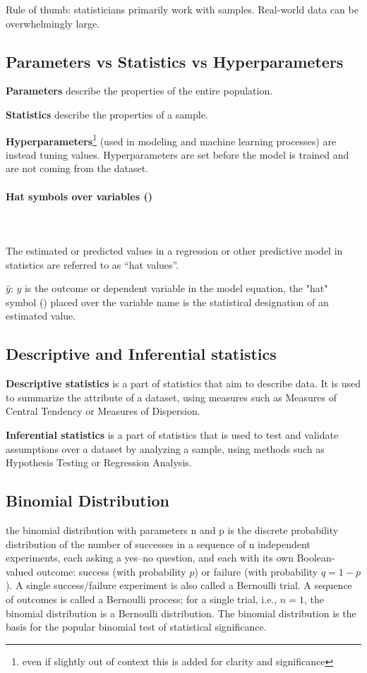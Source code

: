 \documentclass{article}
\begin{document}
Rule of thumb: statisticians primarily work with samples. Real-world data can be overwhelmingly large.

\subsection{Parameters vs Statistics vs Hyperparameters}

\textbf{Parameters} describe the properties of the entire population.

\textbf{Statistics} describe the properties of a sample.

\textbf{Hyperparameters}\footnote{even if slightly out of context this is added for clarity and significance} (used in modeling and machine learning processes) are instead tuning values. Hyperparameters are set before the model is trained and are not coming from the dataset. 

\paragraph{Hat symbols over variables ($\hat{}$)}\mbox{} \\ 
\mbox{} \\
The estimated or predicted values in a regression or other predictive model in statistics are referred to as “hat values”. 

$\hat{y}$: $y$ is the outcome or dependent variable in the model equation, the "hat" symbol ($\hat{}$) placed over the variable name is the statistical designation of an estimated value.


\subsection{Descriptive and Inferential statistics}

\textbf{Descriptive statistics} is a part of statistics that aim to describe data. It is used to summarize the attribute of a dataset, using measures such as Measures of Central Tendency or Measures of Dispersion.

\textbf{Inferential statistics} is a part of statistics that is used to test and validate assumptions over a dataset by analyzing a sample, using methods such as Hypothesis Testing or Regression Analysis.

\subsection{Binomial Distribution}
the binomial distribution with parameters n and p is the discrete probability distribution of the number of successes in a sequence of n independent experiments, each asking a yes–no question, and each with its own Boolean-valued outcome: success (with probability $p$) or failure (with probability $q=1-p$). 
A single success/failure experiment is also called a Bernoulli trial. 
A sequence of outcomes is called a Bernoulli process; for a single trial, i.e., $n = 1$, the binomial distribution is a Bernoulli distribution. 
The binomial distribution is the basis for the popular binomial test of statistical significance.
\end{document}
